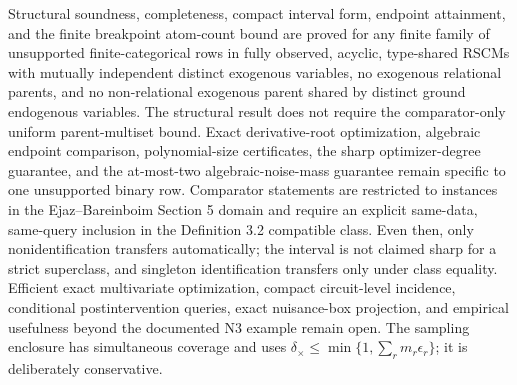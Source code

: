 \documentclass{article}
\begin{document}
Structural soundness, completeness, compact interval form, endpoint attainment, and the finite breakpoint atom-count bound are proved for any finite family of unsupported finite-categorical rows in fully observed, acyclic, type-shared RSCMs with mutually independent distinct exogenous variables, no exogenous relational parents, and no non-relational exogenous parent shared by distinct ground endogenous variables. The structural result does not require the comparator-only uniform parent-multiset bound. Exact derivative-root optimization, algebraic endpoint comparison, polynomial-size certificates, the sharp optimizer-degree guarantee, and the at-most-two algebraic-noise-mass guarantee remain specific to one unsupported binary row. Comparator statements are restricted to instances in the Ejaz--Bareinboim Section 5 domain and require an explicit same-data, same-query inclusion in the Definition 3.2 compatible class. Even then, only nonidentification transfers automatically; the interval is not claimed sharp for a strict superclass, and singleton identification transfers only under class equality. Efficient exact multivariate optimization, compact circuit-level incidence, conditional postintervention queries, exact nuisance-box projection, and empirical usefulness beyond the documented N3 example remain open. The sampling enclosure has simultaneous coverage and uses \(\delta_{\times}\leq\min\{1,\sum_rm_r\epsilon_r\}\); it is deliberately conservative.
\end{document}
